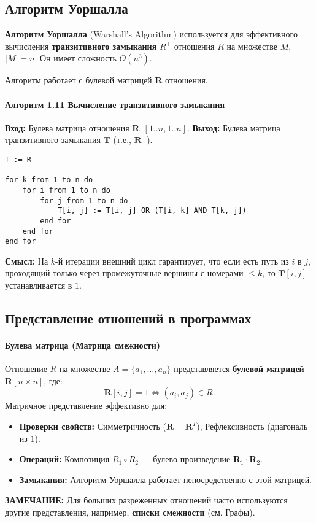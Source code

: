 \subsection*{Алгоритм Уоршалла}

\textbf{Алгоритм Уоршалла} (Warshall's Algorithm) используется для эффективного вычисления \textbf{транзитивного замыкания} $R^+$ отношения $R$ на множестве $M$, $|M|=n$. Он имеет сложность $O(n^3)$.

Алгоритм работает с булевой матрицей $\mathbf{R}$ отношения.

\paragraph{Алгоритм 1.11 Вычисление транзитивного замыкания}
\textbf{Вход:} Булева матрица отношения $\mathbf{R}: [1..n, 1..n]$.
\textbf{Выход:} Булева матрица транзитивного замыкания $\mathbf{T}$ (т.е., $\mathbf{R}^+$).

\begin{verbatim}
T := R

for k from 1 to n do
    for i from 1 to n do
        for j from 1 to n do
            T[i, j] := T[i, j] OR (T[i, k] AND T[k, j])
        end for
    end for
end for
\end{verbatim}

\textbf{Смысл:} На $k$-й итерации внешний цикл гарантирует, что если есть путь из $i$ в $j$, проходящий только через промежуточные вершины с номерами $\le k$, то $\mathbf{T}[i, j]$ устанавливается в $1$.

\subsection*{Представление отношений в программах}
\paragraph{Булева матрица (Матрица смежности)}
Отношение $R$ на множестве $A = \{a_1, \ldots, a_n\}$ представляется \textbf{булевой матрицей} $\mathbf{R}[n \times n]$, где:
$$\mathbf{R}[i, j] = 1 \iff (a_i, a_j) \in R.$$
Матричное представление эффективно для:
\begin{itemize}
    \item \textbf{Проверки свойств:} Симметричность ($\mathbf{R} = \mathbf{R}^T$), Рефлексивность (диагональ из $1$).
    \item \textbf{Операций:} Композиция $R_1 \circ R_2$ --- булево произведение $\mathbf{R}_1 \cdot \mathbf{R}_2$.
    \item \textbf{Замыкания:} Алгоритм Уоршалла работает непосредственно с этой матрицей.
\end{itemize}
\textbf{ЗАМЕЧАНИЕ:} Для больших разреженных отношений часто используются другие представления, например, \textbf{списки смежности} (см. Графы).